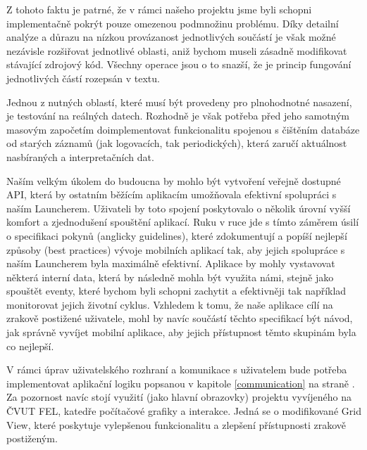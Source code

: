 \documentclass[thesis=M,czech]{FITthesis}[2012/06/26]
\begin{document}
Z tohoto faktu je patrné, že v rámci našeho projektu jsme byli schopni implementačně pokrýt pouze omezenou podmnožinu problému. Díky detailní analýze a důrazu na nízkou provázanost jednotlivých součástí je však možné nezávisle rozšiřovat jednotlivé oblasti, aniž bychom museli zásadně modifikovat stávající zdrojový kód. Všechny operace jsou o to snazší, že je princip fungování jednotlivých částí rozepsán v textu. 

Jednou z nutných oblastí, které musí být provedeny pro plnohodnotné nasazení, je testování na reálných datech. Rozhodně je však potřeba před jeho samotným masovým započetím doimplementovat funkcionalitu spojenou s čištěním databáze od starých záznamů (jak logovacích, tak periodických), která zaručí aktuálnost nasbíraných a interpretačních dat.

Naším velkým úkolem do budoucna by mohlo být vytvoření veřejně dostupné API, která by ostatním běžícím aplikacím umožňovala efektivní spolupráci s naším Launcherem. Uživateli by toto spojení poskytovalo o několik úrovní vyšší komfort a zjednodušení spouštění aplikací. Ruku v ruce jde s tímto záměrem úsilí o specifikaci pokynů (anglicky guidelines), které zdokumentují a popíší nejlepší způsoby (best practices) vývoje mobilních aplikací tak, aby jejich spolupráce s naším Launcherem byla maximálně efektivní. Aplikace by mohly vystavovat některá interní data, která by následně mohla být využita námi, stejně jako spouštět eventy, které bychom byli schopni zachytit a efektivněji tak například monitorovat jejich životní cyklus. Vzhledem k tomu, že naše aplikace cílí na zrakově postižené uživatele, mohl by navíc součástí těchto specifikací být návod, jak správně vyvíjet mobilní aplikace, aby jejich přístupnost těmto skupinám byla co nejlepší.

V rámci úprav uživatelského rozhraní a komunikace s uživatelem bude potřeba implementovat aplikační logiku popsanou v kapitole \ref{communication} na straně \pageref{communication}. Za pozornost navíc stojí využití (jako hlavní obrazovky) projektu vyvíjeného na ČVUT FEL, katedře počítačové grafiky a interakce. Jedná se o modifikované Grid View\cite{grid_view}, které poskytuje vylepšenou funkcionalitu a zlepšení přístupnosti zrakově postiženým.
\end{document}
